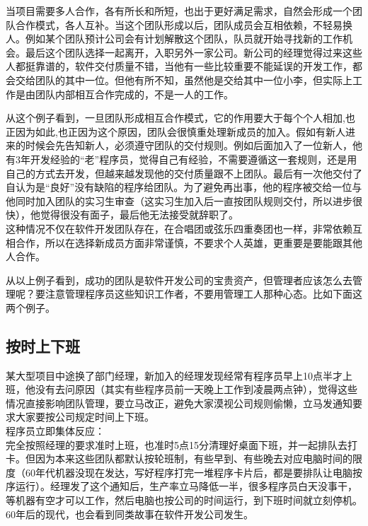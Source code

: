 当项目需要多人合作，各有所长和所短，也出于更好满足需求，自然会形成一个团队合作模式，各人互补。当这个团队形成以后，团队成员会互相依赖，不轻易换人。例如某个团队预计公司会有计划解散这个团队，队员就开始寻找新的工作机会。最后这个团队选择一起离开，入职另外一家公司。新公司的经理觉得过来这些人都挺靠谱的，软件交付质量不错，当他有一些比较重要不能延误的开发工作，都会交给团队的其中一位。但他有所不知，虽然他是交给其中一位小李，但实际上工作是由团队内部相互合作完成的，不是一人的工作。

从这个例子看到，一旦团队形成相互合作模式，它的作用要大于每个个人相加,也正因为如此,也正因为这个原因，团队会很慎重处理新成员的加入。假如有新人进来的时候会先告知新人，必须遵守团队的交付规则。例如后面加入了一位新人，他有3年开发经验的``老''程序员，觉得自己有经验，不需要遵循这一套规则，还是用自己的方式去开发，但越来越发现他的交付质量跟不上团队。最后有一次他交付了自认为是``良好''没有缺陷的程序给团队。为了避免再出事，他的程序被交给一位与他同时加入团队的实习生审查（这实习生加入后一直按团队规则交付，所以进步很快），他觉得很没有面子，最后他无法接受就辞职了。\\
这种情况不仅在软件开发团队存在，在合唱团或弦乐四重奏团也一样，非常依赖互相合作，所以在选择新成员方面非常谨慎，不要求个人英雄，更重要是要能跟其他人合作。

从以上例子看到，成功的团队是软件开发公司的宝贵资产，但管理者应该怎么去管理呢？要注意管理程序员这些知识工作者，不要用管理工人那种心态。比如下面这两个例子。\\

\hypertarget{ux6309ux65f6ux4e0aux4e0bux73ed}{%
\subsection{按时上下班}\label{ux6309ux65f6ux4e0aux4e0bux73ed}}

某大型项目中途换了部门经理，新加入的经理发现经常有程序员早上10点半才上班，他没有去问原因（其实有些程序员前一天晚上工作到凌晨两点钟），觉得这些情况直接影响团队管理，要立马改正，避免大家漠视公司规则偷懒，立马发通知要求大家要按公司规定时间上下班。\\
程序员立即集体反应：\\
完全按照经理的要求准时上班，也准时5点15分清理好桌面下班，并一起排队去打卡。但因为本来这些团队都默认按轮班制，有些早到、有些晚去对应电脑时间的限度（60年代机器没现在发达，写好程序打完一堆程序卡片后，都是要排队让电脑按序运行）。经理发了这个通知后，生产率立马降低一半，很多程序员白天没事干，等机器有空才可以工作，然后电脑也按公司的时间运行，到下班时间就立刻停机。\\
60年后的现代，也会看到同类故事在软件开发公司发生。\\

